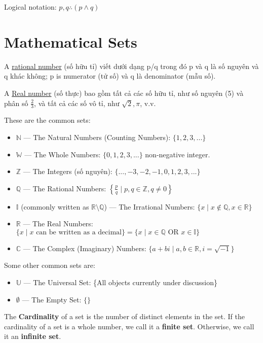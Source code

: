 Logical notation: \(p,q \therefore (p \wedge q)\)

\section{Mathematical Sets}

A \href{https://en.wikipedia.org/wiki/Rational_number}{rational number} (số hữu tỉ) viết dưới dạng p/q trong đó p và q là số nguyên và q khác không; p is numerator (tử số) và q là denominator (mẫu số).

A \href{https://en.wikipedia.org/wiki/Real_number}{Real number} (số thực) bao gồm tất cả các số hữu tỉ, như số nguyên (5) và phân số \(\frac{2}{3}\), và tất cả các số vô tỉ, như \(\sqrt{2}, \pi\), v.v.

These are the common sets:

\begin{itemize}
  \item $\mathbb{N}$ --- The Natural Numbers (Counting Numbers): $\{1,2,3,...\}$
  \item $\mathbb{W}$ --- The Whole Numbers: $\{0,1,2,3,...\}$ non-negative integer.
  \item $\mathbb{Z}$ --- The Integers (số nguyên): $\{...,-3,-2,-1,0,1,2,3,...\}$
  \item $\mathbb{Q}$ --- The Rational Numbers: $\left\{ \frac{p}{q} \mid p,q \in \mathbb{Z}, q \neq 0 \right\}$
  \item $\mathbb{I}$ (commonly written as $\mathbb{R} \setminus \mathbb{Q}$) --- The Irrational Numbers: $\{x \mid x \not\in \mathbb{Q}, x \in \mathbb{R}\}$
  \item $\mathbb{R}$ --- The Real Numbers: $\{x \mid x \text{ can be written as a decimal}\} = \{x \mid x \in \mathbb{Q} \text{ OR } x \in \mathbb{I}\}$
  \item $\mathbb{C}$ --- The Complex (Imaginary) Numbers: $\{a+bi \mid a,b \in \mathbb{R} , i=\sqrt{-1}\}$
\end{itemize}

Some other common sets are:

\begin{itemize}
  \item $\mathbb{U}$ --- The Universal Set: \{All objects currently under discussion\}
  \item $\emptyset$ --- The Empty Set: \(\{\}\)
\end{itemize}

The \textbf{Cardinality} of a set is the number of distinct elements in the set. If the cardinality of a set is a whole number, we call it a \textbf{finite set}. Otherwise, we call it an \textbf{infinite set}.


